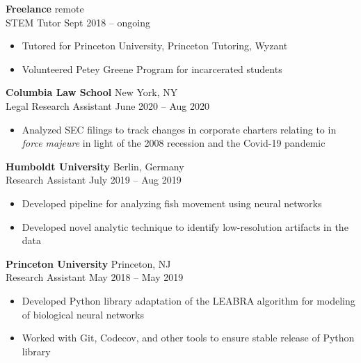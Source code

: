 \documentclass[12pt]{article}
\newcommand{\entry}[4]{{{\textbf{#1}}} \hfill #3 \\ #2 \hfill #4}
\begin{document}
\begin{paracol}{2}
\smallskip

\entry{Freelance}{STEM Tutor}{remote}{Sept 2018 -- ongoing}
\begin{itemize}[noitemsep,leftmargin=3.5mm,rightmargin=0mm,topsep=6pt]
  \item Tutored for Princeton University, Princeton Tutoring, Wyzant
  \item Volunteered Petey Greene Program for incarcerated students
\end{itemize}

\smallskip

\entry{Columbia Law School}{Legal Research Assistant}{New York, NY}{June 2020 -- Aug 2020}
\begin{itemize}[noitemsep,leftmargin=3.5mm,rightmargin=0mm,topsep=6pt]
  \item Analyzed SEC filings to track changes in corporate charters relating to in \textit{force majeure} in light of the 2008 recession and the Covid-19 pandemic
\end{itemize}

\smallskip

\entry{Humboldt University}{Research Assistant}{Berlin, Germany}{July 2019 -- Aug 2019}
\begin{itemize}[noitemsep,leftmargin=3.5mm,rightmargin=0mm,topsep=6pt]
  \item Developed pipeline for analyzing fish movement using neural
networks
  \item Developed novel analytic technique to identify low-resolution artifacts in the data
\end{itemize}

\smallskip

\entry{Princeton University}{Research Assistant}{Princeton, NJ}{May 2018 -- May 2019}
\begin{itemize}[noitemsep,leftmargin=3.5mm,rightmargin=0mm,topsep=6pt]
  \item Developed Python library adaptation of the LEABRA algorithm for modeling of biological neural networks
  \item Worked with Git, Codecov, and other tools to ensure stable release of Python library
\end{itemize}


\end{paracol}
\end{document}
